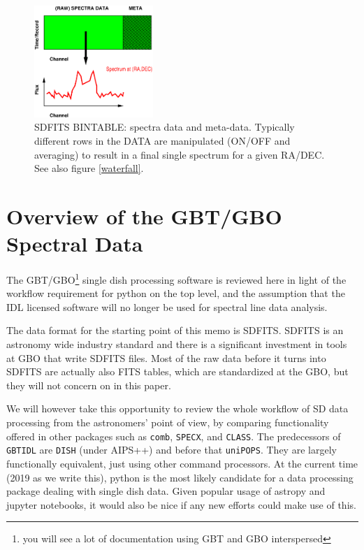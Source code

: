 \documentclass[12pt,a4paper]{article}
\begin{document}
\begin{figure}[ht]
\centering
  \includegraphics[width=0.4\textwidth]{fig2.eps}
  \caption{\label{bintable} SDFITS BINTABLE: spectra data and meta-data.
    Typically different rows in the DATA are manipulated (ON/OFF and averaging)
    to result in a final single spectrum for a given RA/DEC. See also
    figure \ref{waterfall}.}
\end{figure}


\section{Overview of the GBT/GBO Spectral Data}

The GBT/GBO\footnote{you will see a lot of documentation using GBT and
  GBO interspersed} single dish processing software is reviewed here in
light of the workflow requirement for python on the top level, and the assumption
that the IDL licensed software will no longer be used for spectral line data analysis.

The data format for the starting point of this memo is SDFITS. SDFITS is an astronomy wide industry standard and there is a significant
investment in tools at GBO that write SDFITS files. Most of the raw
data before it turns into SDFITS are actually also FITS tables, which
are standardized at the GBO, but they will not concern on in this
paper.

We will however take this opportunity to review the whole workflow of
SD data processing from the astronomers' point of view, by
comparing functionality offered in other packages such as {\tt comb},
{\tt SPECX}, and {\tt CLASS}. The predecessors of {\tt GBTIDL} are
{\tt DISH} (under AIPS++) and before that {\tt uniPOPS}. They are
largely functionally equivalent, just using other command
processors. At the current time (2019 as we write this), python is the
most likely candidate for a data processing package dealing with
single dish data. Given popular usage of astropy and jupyter
notebooks, it would also be nice if any new efforts could make use of
this.
\end{document}
